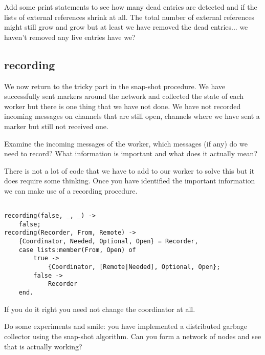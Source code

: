 \documentclass[a4paper,11pt]{article}
\begin{document}
Add some print statements to see how many dead entries are detected
and if the lists of external references shrink at all. The total
number of external references might still grow and grow but at least
we have removed the dead entries... we haven't removed any live
entries have we?

\subsection{recording}

We now return to the tricky part in the snap-shot procedure. We have
successfully sent markers around the network and collected the state of
each worker but there is one thing that we have not done. We have not
recorded incoming messages on channels that are still open, channels
where we have sent a marker but still not received one.

Examine the incoming messages of the worker, which messages (if any)
do we need to record? What information is important and what does it
actually mean? 

There is not a lot of code that we have to add to our worker to solve
this but it does require some thinking. Once you have identified the
important information we can make use of a recording procedure.

\begin{verbatim}

recording(false, _, _) ->
    false;
recording(Recorder, From, Remote) ->
    {Coordinator, Needed, Optional, Open} = Recorder,
    case lists:member(From, Open) of
        true ->
            {Coordinator, [Remote|Needed], Optional, Open};
        false ->
            Recorder
    end.
\end{verbatim}

If you do it right you need not change the coordinator at all. 

Do some experiments and smile: you have implemented a distributed
garbage collector using the snap-shot algorithm. Can you form a
network of nodes and see that is actually working?
\end{document}
